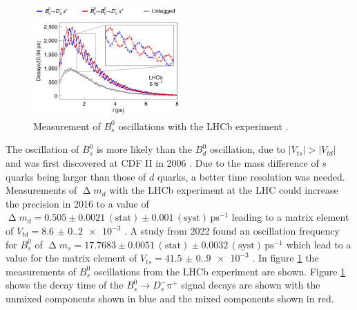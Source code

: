 \begin{figure}
    \centering
    \includegraphics[width=0.5\textwidth]{figs/LHCbResults.png}
    \caption{Measurement of $B_s^0$ oscillations with the LHCb experiment \cite{LHCb2}.}
    \label{fig:LHCbResults}
\end{figure}
The oscillation of $B_s^0$ is more likely than the $B_d^0$ oscillation, due to $|V_{ts}|>|V_{td}|$ and was first discovered at CDF II in 2006 \cite{PhysRevLett.97.242003}.
Due to the mass difference of $s$ quarks being larger than those of $d$ quarks, a better time resolution was needed.
Measurements of $\upDelta m_d$ with the LHCb experiment at the LHC could increase the precision in 2016 \cite{LHCb1} to a value of $\upDelta m_d = 0.505\pm0.0021\,(\text{stat})\pm0.001\,(\text{syst})\,\text{ps}^{-1}$ leading to a matrix element of $V_{td}=\num{8.6(0.2)e-3}$ \cite{Workman:2022ynf}.
A study from 2022 found an oscillation frequency for $B_s^0$ of $\upDelta m_s = 17.7683 \pm 0.0051\,(\text{stat}) \pm 0.0032\,(\text{syst})\,\text{ps}^{-1}$ \cite{LHCb2} which lead to a value for the matrix element of $V_{ts}=\num{41.5(0.9)e-3}$ \cite{Workman:2022ynf}.
In figure \ref{fig:LHCbResults} the measurements of $B_s^0$ oscillations from the LHCb experiment are shown.
Figure \ref{fig:LHCbResults} shows the decay time of the $B_s^0\rightarrow D_s^-\pi^+$ signal decays are shown with the unmixed components shown in blue and the mixed components shown in red.